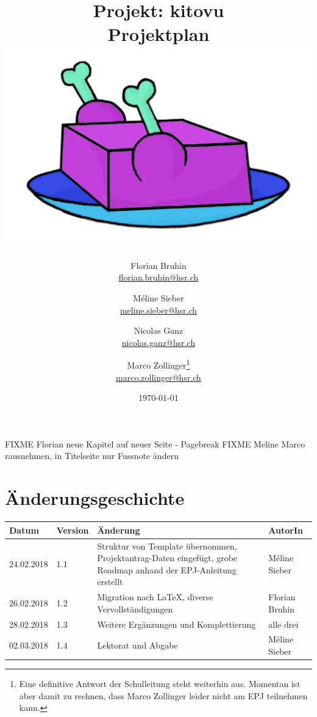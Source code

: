 \documentclass[a4paper]{article}
\begin{document}
\title{
  Projekt: kitovu \\
  \Large{Projektplan} \\[3em]
  \includegraphics[width=20em]{../../img/logo/kitovu.jpg}
}
\author{
  Florian Bruhin \\ \url{florian.bruhin@hsr.ch} \and
  Méline Sieber \\ \url{meline.sieber@hsr.ch} \and
  Nicolas Ganz \\ \url{nicolas.ganz@hsr.ch} \and
  Marco Zollinger\footnote{Eine definitive Antwort der Schulleitung steht
    weiterhin aus. Momentan ist aber damit zu rechnen, dass Marco Zollinger
    leider nicht am EPJ teilnehmen kann.} \\ \url{marco.zollinger@hsr.ch}}
\date{\today}

\maketitle
\pagebreak

\def\jiraurl{https://jira.keltec.ch/jira}
\def\confluenceurl{https://jira.keltec.ch/wiki}

\newcommand{\jiraissue}[1]{\href{\jiraurl/projects/EPJ/issues/EPJ-#1}{EPJ-#1}}
\newcommand{\fulljiraissue}[1]{EPJ-#1 (\url{\jiraurl/projects/EPJ/issues/EPJ-#1})}

FIXME Florian neue Kapitel auf neuer Seite - Pagebreak
FIXME Meline Marco rausnehmen, in Titelseite nur Fussnote ändern

\section*{Änderungsgeschichte}

\begin{tabular}{ll>{\raggedright}p{20em}l}
\toprule
Datum & Version & Änderung & AutorIn \\
\midrule
24.02.2018 & 1.1 & Struktur von Template übernommen, Projektantrag-Daten eingefügt, grobe Roadmap anhand der EPJ-Anleitung erstellt & Méline Sieber \\
26.02.2018 & 1.2 & Migration nach \LaTeX{}, diverse Vervollständigungen & Florian Bruhin \\
28.02.2018 & 1.3 & Weitere Ergänzungen und Komplettierung & alle drei \\
02.03.2018 & 1.4 & Lektorat und Abgabe & Méline Sieber \\
\bottomrule
\end{tabular}
\pagebreak
\end{document}
